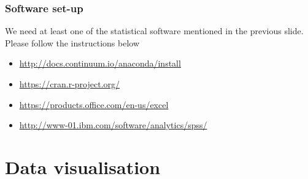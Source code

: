 \documentclass[10pt, compress]{beamer}
\begin{document}
\begin{frame}[fragile]
    \frametitle{Software set-up}
    We need at least one of the statistical software mentioned in the
    previous slide. Please follow the instructions below
    \begin{itemize}
        \item \url{http://docs.continuum.io/anaconda/install}%
        \item \url{https://cran.r-project.org/}%
        \item \url{https://products.office.com/en-us/excel}%
        \item \url{http://www-01.ibm.com/software/analytics/spss/}
    \end{itemize}
    \smallskip
\end{frame}

\section{Data visualisation}
\end{document}
